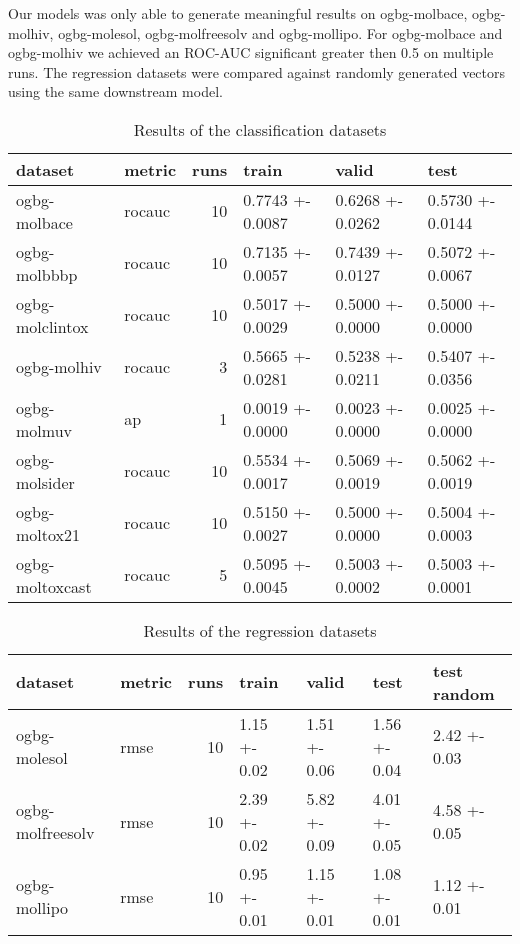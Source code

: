 Our models was only able to generate meaningful results on ogbg-molbace, ogbg-molhiv, ogbg-molesol, ogbg-molfreesolv and ogbg-mollipo. For ogbg-molbace and ogbg-molhiv we achieved an ROC-AUC significant greater then 0.5 on multiple runs. The regression datasets were compared against randomly generated vectors using the same downstream model.

\begin{table}[h!]
    \centering
    \begin{tabular}{llrlll}
        \toprule
        dataset         & metric & runs & train            & valid            & test             \\
        \midrule
        ogbg-molbace    & rocauc & 10   & 0.7743 +- 0.0087 & 0.6268 +- 0.0262 & 0.5730 +- 0.0144 \\
        ogbg-molbbbp    & rocauc & 10   & 0.7135 +- 0.0057 & 0.7439 +- 0.0127 & 0.5072 +- 0.0067 \\
        ogbg-molclintox & rocauc & 10   & 0.5017 +- 0.0029 & 0.5000 +- 0.0000 & 0.5000 +- 0.0000 \\
        ogbg-molhiv     & rocauc & 3    & 0.5665 +- 0.0281 & 0.5238 +- 0.0211 & 0.5407 +- 0.0356 \\
        ogbg-molmuv     & ap     & 1    & 0.0019 +- 0.0000 & 0.0023 +- 0.0000 & 0.0025 +- 0.0000 \\
        ogbg-molsider   & rocauc & 10   & 0.5534 +- 0.0017 & 0.5069 +- 0.0019 & 0.5062 +- 0.0019 \\
        ogbg-moltox21   & rocauc & 10   & 0.5150 +- 0.0027 & 0.5000 +- 0.0000 & 0.5004 +- 0.0003 \\
        ogbg-moltoxcast & rocauc & 5    & 0.5095 +- 0.0045 & 0.5003 +- 0.0002 & 0.5003 +- 0.0001 \\
        \bottomrule
    \end{tabular}

    \caption{Results of the classification datasets}
    \label{table:ogbg-classification_results}
\end{table}

\begin{table}[h!]
    \centering
    \begin{tabular}{llrllll}
        \toprule
        dataset          & metric & runs & train        & valid        & test         & test random  \\
        \midrule
        ogbg-molesol     & rmse   & 10   & 1.15 +- 0.02 & 1.51 +- 0.06 & 1.56 +- 0.04 & 2.42 +- 0.03 \\
        ogbg-molfreesolv & rmse   & 10   & 2.39 +- 0.02 & 5.82 +- 0.09 & 4.01 +- 0.05 & 4.58 +- 0.05 \\
        ogbg-mollipo     & rmse   & 10   & 0.95 +- 0.01 & 1.15 +- 0.01 & 1.08 +- 0.01 & 1.12 +- 0.01 \\
        \bottomrule
    \end{tabular}
    \caption{Results of the regression datasets}
    \label{table:ogbg-regression_results}
\end{table}


